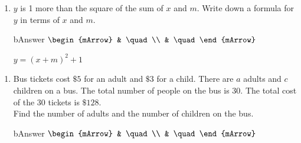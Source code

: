 \begin{enumerate}[resume]
   \item \begin{exercise} $y$ is 1 more than the square of the sum of $x$ and $m$.
                          Write down a formula for $y$ in terms of $x$ and $m$.
           \begin{envOut}[height=6cm]{bAnswer}
		      $\begin{mArrow}
		            &  \quad                       \\ 
                    &  \quad      						  
	           \end{mArrow}$
           \end{envOut}			  
	       \begin{shortsolution}  
	            $y=(x+m)^2 + 1 $
           \end{shortsolution}
  	    \end{exercise}
\end{enumerate}

\begin{enumerate}[resume]
   \item \begin{exercise} Bus tickets cost $\$5$ for an adult and $\$3$ for a child. There are $a$ adults and $c$ children on a bus. The total number of people on the bus is 30. The total cost of the 30 tickets is $\$128$.\\
Find the number of adults and the number of children on the bus.
           \begin{envOut}[height=6cm]{bAnswer}
		      $\begin{mArrow}
		            &  \quad                       \\ 
                    &  \quad      						  
	           \end{mArrow}$
           \end{envOut}			  
	       \begin{shortsolution}  
	            $\quad $
           \end{shortsolution}
  	    \end{exercise}
\end{enumerate}	  	  